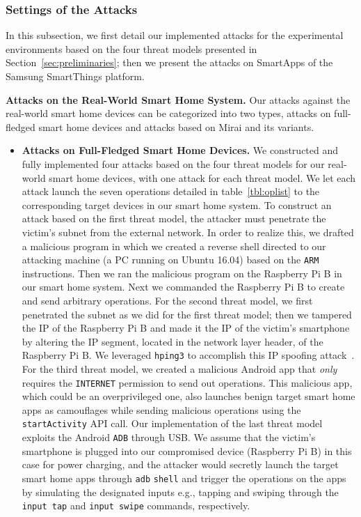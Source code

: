 \documentclass[letterpaper,12pt]{article}
\begin{document}
\subsubsection{Settings of the Attacks}
In this subsection, we first detail our implemented attacks for the experimental environments based on the four threat models presented in Section~\ref{sec:preliminaries}; then we present the attacks on SmartApps of the Samsung SmartThings platform.

\textbf{Attacks on the Real-World Smart Home System.} 
Our attacks against the real-world smart home devices can be categorized into two types, attacks on full-fledged smart home devices and attacks based on Mirai and its variants.

\begin{itemize}

\item \textbf{Attacks on Full-Fledged Smart Home Devices.}
We constructed and fully implemented four attacks based on the four threat models for our real-world smart home devices, with one attack for each threat model. We let each attack launch the seven operations detailed in table~\ref{tbl:oplist} to the corresponding target devices in our smart home system. To construct an attack based on the first threat model, the attacker must penetrate the victim's subnet from the external network. In order to realize this, we drafted a malicious program in which we created a reverse shell directed to our attacking machine (a PC running on Ubuntu 16.04) based on the \texttt{ARM} instructions. Then we ran the malicious program on the Raspberry Pi B in our smart home system. Next we commanded the Raspberry Pi B to create and send arbitrary operations. For the second threat model, we first penetrated the subnet as we did for the first threat model; then we tampered the IP of the Raspberry Pi B and made it the IP of the victim's smartphone by altering the IP segment, located in the network layer header, of the Raspberry Pi B. We leveraged \texttt{hping3} 
to accomplish this IP spoofing attack~\cite{hping3}. For the third threat model, we created a malicious Android app that \emph{only} requires the \texttt{INTERNET} permission to send out operations. This malicious app, which could be an overprivileged one, also launches benign target smart home apps as camouflages while sending malicious operations using the \texttt{startActivity} API call. Our implementation of the last threat model exploits the Android \texttt{ADB} through USB. We assume that the victim's smartphone is plugged into our compromised device (Raspberry Pi B) in this case for power charging, and the attacker would secretly launch the target smart home apps through \texttt{adb} \texttt{shell} and trigger the operations on the apps by simulating the designated inputs e.g., tapping and swiping through the \texttt{input tap} and \texttt{input swipe} commands, respectively.


\end{itemize}
\end{document}
